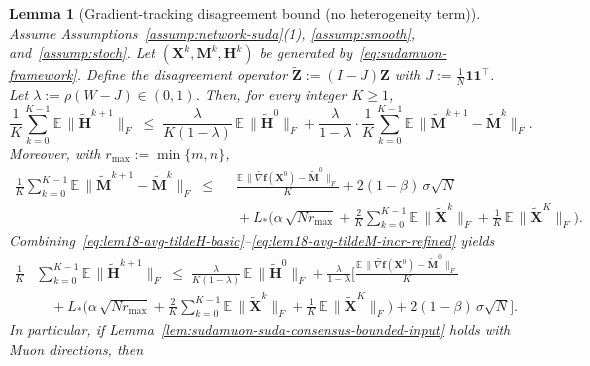 \documentclass{article}
\newtheorem{lemma}{Lemma}
\begin{document}
\begin{lemma}[Gradient-tracking disagreement bound (no heterogeneity term)]
\label{lem:sudamuon-gt-disagreement-O1mb}
Assume Assumptions~\ref{assump:network-suda}(1), \ref{assump:smooth}, and~\ref{assump:stoch}.
Let $(\mathbf X^k,\mathbf M^k,\mathbf H^k)$ be generated by~\eqref{eq:sudamuon-framework}.
Define the disagreement operator $\tilde{\mathbf Z}:=(I-J)\mathbf Z$ with $J:=\tfrac1N\mathbf 1\mathbf 1^\top$.
Let $\lambda:=\rho(W-J)\in(0,1)$.
Then, for every integer $K\ge 1$,
\begin{equation}
\label{eq:lem18-avg-tildeH-basic}
\frac{1}{K}\sum_{k=0}^{K-1}\mathbb{E}\,\|\tilde{\mathbf H}^{k+1}\|_F
\;\le\;
\frac{\lambda}{K(1-\lambda)}\,\mathbb{E}\,\|\tilde{\mathbf H}^{0}\|_F
+\frac{\lambda}{1-\lambda}\cdot \frac{1}{K}\sum_{k=0}^{K-1}\mathbb{E}\,\|\tilde{\mathbf M}^{k+1}-\tilde{\mathbf M}^{k}\|_F.
\end{equation}
Moreover, with $r_{\max}:=\min\{m,n\}$,
\begin{equation}
\label{eq:lem18-avg-tildeM-incr-refined}
\begin{split}
\frac{1}{K}\sum_{k=0}^{K-1}\mathbb{E}\,\|\tilde{\mathbf M}^{k+1}-\tilde{\mathbf M}^{k}\|_F
\;\le\;&\;
\frac{\mathbb{E}\,\|\widetilde{\nabla \mathbf f}(\mathbf X^0)-\tilde{\mathbf M}^0\|_F}{K}
+2(1-\beta)\,\sigma\sqrt N
\\&\;+L_*\Bigg(\alpha\,\sqrt{Nr_{\max}}+\frac{2}{K}\sum_{k=0}^{K-1}\mathbb{E}\,\|\tilde{\mathbf X}^{k}\|_F+\frac{1}{K}\,\mathbb{E}\,\|\tilde{\mathbf X}^{K}\|_F\Bigg).
\end{split}
\end{equation}
Combining~\eqref{eq:lem18-avg-tildeH-basic}--\eqref{eq:lem18-avg-tildeM-incr-refined} yields
\begin{equation}
\label{eq:lem18-avg-tildeH-refined}
\begin{split}
\frac{1}{K}&\sum_{k=0}^{K-1}\mathbb{E}\,\|\tilde{\mathbf H}^{k+1}\|_F
\;\le\;
\frac{\lambda}{K(1-\lambda)}\,\mathbb{E}\,\|\tilde{\mathbf H}^{0}\|_F
+\frac{\lambda}{1-\lambda}\Bigg[
\frac{\mathbb{E}\,\|\widetilde{\nabla \mathbf f}(\mathbf X^0)-\tilde{\mathbf M}^0\|_F}{K}
\\&\quad+L_*\Bigg(\alpha\,\sqrt{Nr_{\max}}+\frac{2}{K}\sum_{k=0}^{K-1}\mathbb{E}\,\|\tilde{\mathbf X}^{k}\|_F+\frac{1}{K}\,\mathbb{E}\,\|\tilde{\mathbf X}^{K}\|_F\Bigg)
+2(1-\beta)\,\sigma\sqrt N\Bigg].
\end{split}
\end{equation}
In particular, if Lemma~\ref{lem:sudamuon-suda-consensus-bounded-input} holds with Muon directions, then

\end{lemma}
\end{document}
